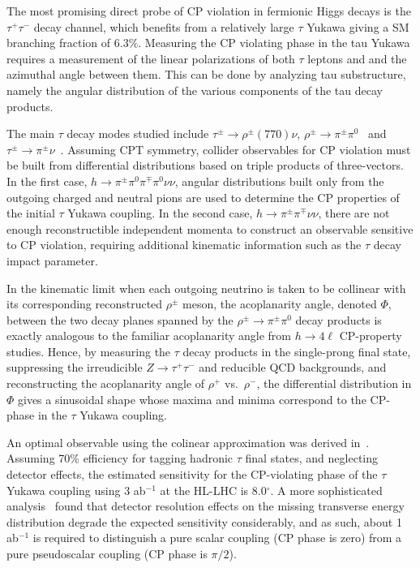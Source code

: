 \documentclass[../report.tex]{subfiles}
\begin{document}
The most promising direct probe of CP violation in fermionic Higgs
decays is the $\tau^+ \tau^-$ decay channel, which benefits from a
relatively large $\tau$ Yukawa giving a SM branching fraction of
$6.3\%$. Measuring the CP violating phase in the tau Yukawa requires a measurement of the linear polarizations of both $\tau$ leptons and and the azimuthal angle between them. This can be done by analyzing tau substructure, namely the angular distribution of the various components of the tau decay products.

The main $\tau$ decay modes studied include $\tau^\pm \to
\rho^\pm (770) \nu$, $\rho^\pm \to \pi^\pm \pi^0$~\cite{Bower:2002zx,
  Desch:2003mw, Desch:2003rw, Harnik:2013aja, Askew:2015mda,
  Jozefowicz:2016kvz} and $\tau^\pm \to \pi^\pm
\nu$~\cite{Berge:2008wi, Berge:2008dr, Berge:2011ij}.  Assuming CPT
symmetry, collider observables for CP violation must be built from
differential distributions based on triple products of three-vectors.
In the first case, $h \to \pi^\pm \pi^0 \pi^\mp \pi^0 \nu \nu$,
angular distributions built only from the outgoing charged and neutral
pions are used to determine the CP properties of the initial $\tau$
Yukawa coupling.  In the second case, $h \to \pi^\pm \pi^\mp \nu \nu$,
there are not enough reconstructible independent momenta to construct an observable sensitive to CP violation, requiring additional kinematic information such as the $\tau$ decay impact parameter.

In the kinematic limit when each outgoing neutrino is taken to be
collinear with its corresponding reconstructed $\rho^\pm$ meson, the
acoplanarity angle, denoted $\Phi$, between the two decay planes
spanned by the $\rho^\pm \to \pi^\pm \pi^0$ decay products is exactly
analogous to the familiar acoplanarity angle from $h \to 4 \ell$
CP-property studies.  Hence, by measuring the $\tau$ decay products in
the single-prong final state, suppressing the irreudicible $Z \to
\tau^+ \tau^-$ and reducible QCD backgrounds, and reconstructing the
acoplanarity angle of $\rho^+$ vs.~$\rho^-$, the differential
distribution in $\Phi$ gives a sinusoidal shape whose maxima and
minima correspond to the CP-phase in the $\tau$ Yukawa coupling.  

An optimal observable using the colinear approximation was derived in~\cite{Harnik:2013aja}. Assuming 70\% efficiency for tagging hadronic $\tau$ final states, and
neglecting detector effects, the estimated sensitivity for the
CP-violating phase of the $\tau$ Yukawa coupling using 3 ab$^{-1}$ at
the HL-LHC is 8.0$^\circ$.  A more sophisticated
analysis~\cite{Askew:2015mda} found that detector resolution effects
on the missing transverse energy distribution degrade the expected
sensitivity considerably, and as such, about 1 ab$^{-1}$ is required
to distinguish a pure scalar coupling (CP phase is zero) from a pure
pseudoscalar coupling (CP phase is $\pi/2$).
\end{document}
